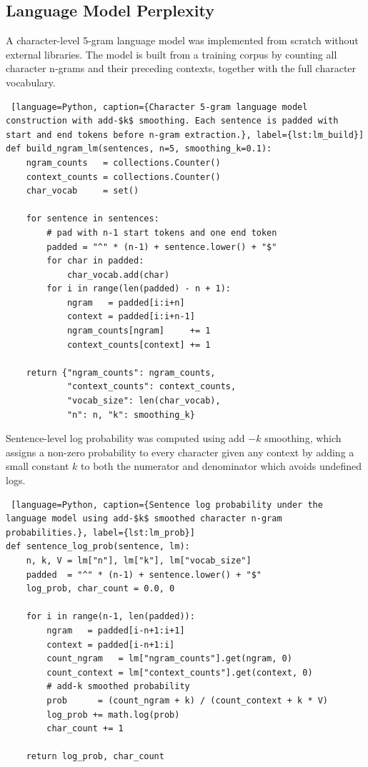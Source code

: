 \documentclass[11pt,a4paper]{article}
\begin{document}
\subsection{Language Model Perplexity}

A character-level 5-gram language model was implemented from scratch without external libraries. The model is built from a training corpus by counting all character n-grams and their preceding contexts, together with the full character vocabulary.

\begin{lstlisting} [language=Python, caption={Character 5-gram language model construction with add-$k$ smoothing. Each sentence is padded with start and end tokens before n-gram extraction.}, label={lst:lm_build}]
def build_ngram_lm(sentences, n=5, smoothing_k=0.1):
    ngram_counts   = collections.Counter()
    context_counts = collections.Counter()
    char_vocab     = set()
 
    for sentence in sentences:
        # pad with n-1 start tokens and one end token
        padded = "^" * (n-1) + sentence.lower() + "$"
        for char in padded:
            char_vocab.add(char)
        for i in range(len(padded) - n + 1):
            ngram   = padded[i:i+n]
            context = padded[i:i+n-1]
            ngram_counts[ngram]     += 1
            context_counts[context] += 1
 
    return {"ngram_counts": ngram_counts,
            "context_counts": context_counts,
            "vocab_size": len(char_vocab),
            "n": n, "k": smoothing_k}
\end{lstlisting}

Sentence-level log probability was computed using add $-k$ smoothing, which assigns a non-zero probability to every character given any context by adding a small constant $k$ to both the numerator and denominator which avoids undefined logs.

\begin{lstlisting} [language=Python, caption={Sentence log probability under the language model using add-$k$ smoothed character n-gram probabilities.}, label={lst:lm_prob}]
def sentence_log_prob(sentence, lm):
    n, k, V = lm["n"], lm["k"], lm["vocab_size"]
    padded  = "^" * (n-1) + sentence.lower() + "$"
    log_prob, char_count = 0.0, 0
 
    for i in range(n-1, len(padded)):
        ngram   = padded[i-n+1:i+1]
        context = padded[i-n+1:i]
        count_ngram   = lm["ngram_counts"].get(ngram, 0)
        count_context = lm["context_counts"].get(context, 0)
        # add-k smoothed probability
        prob      = (count_ngram + k) / (count_context + k * V)
        log_prob += math.log(prob)
        char_count += 1
 
    return log_prob, char_count
\end{lstlisting}
\end{document}
